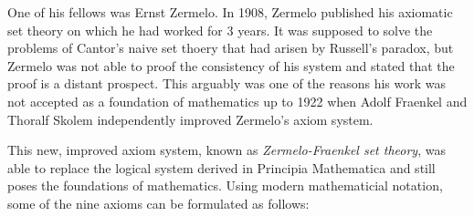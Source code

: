\documentclass[hidelinks]{article}
\theoremstyle{plain}
\theoremstyle{definition}
\theoremstyle{rem}
\begin{document}
One of his fellows was Ernst Zermelo. In 1908, Zermelo published his axiomatic set theory on which he had worked for 3 years. It was supposed to solve the problems of Cantor's naive set thoery that had arisen by Russell's paradox, but Zermelo was not able to proof the consistency of his system and stated that the proof is a distant prospect. This arguably was one of the reasons his work was not accepted as a foundation of mathematics up to 1922 when Adolf Fraenkel and Thoralf Skolem independently improved Zermelo's axiom system. 

This new, improved axiom system, known as \textit{Zermelo-Fraenkel set theory}, was able to replace the logical system derived in Principia Mathematica and still poses the foundations of mathematics. Using modern mathematicial notation, some of the nine axioms can be formulated as follows:
\scriptsize
\end{document}
